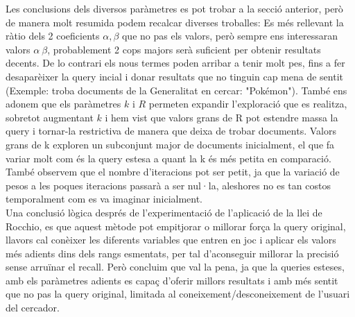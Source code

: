 \documentclass[12pt]{article}
\begin{document}
Les conclusions dels diversos paràmetres es pot trobar a la secció anterior, però de manera molt resumida podem recalcar diverses troballes: Es més rellevant la ràtio dels 2 coeficients $\alpha, \beta$ que no pas els valors, però sempre ens interessaran valors $\alpha \> \beta$, probablement 2 cops majors serà suficient per obtenir resultats decents. De lo contrari els nous termes poden arribar a tenir molt pes, fins a fer desaparèixer la query incial i donar resultats que no tinguin cap mena de sentit (Exemple: troba documents de la Generalitat en cercar: "Pokémon"). També ens adonem que els paràmetres $k$ i $R$ permeten expandir l'exploració que es realitza, sobretot augmentant $k$ i hem vist que valors grans de R pot estendre massa la query i tornar-la restrictiva de manera que deixa de trobar documents. Valors grans de k exploren un subconjunt major de documents inicialment, el que fa variar molt com és la query estesa a quant la k és més petita en comparació. També observem que el nombre d'iteracions pot ser petit, ja que la variació de pesos a les poques iteracions passarà a ser nul·la, aleshores no es tan costos temporalment com es va imaginar inicialment.
\\

Una conclusió lògica després de l'experimentació de l'aplicació de la llei de Rocchio, es que aquest mètode pot empitjorar o millorar força la query original, llavors cal conèixer les diferents variables que entren en joc i aplicar els valors més adients dins dels rangs esmentats, per tal d'aconseguir millorar la precisió sense arruïnar el recall. Però concluim que val la pena, ja que la queries esteses, amb els paràmetres adients es capaç d'oferir millors resultats i amb més sentit que no pas la query original, limitada al coneixement/desconeixement de l'usuari del cercador.
\end{document}
